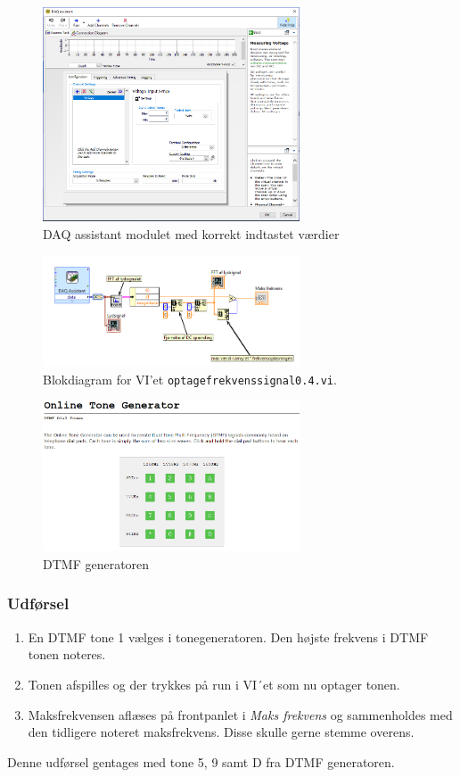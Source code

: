 \begin{figure}
			\centering
			\includegraphics[width=3in]{DAQassistant}
			\caption{DAQ assistant modulet med korrekt indtastet værdier}
			\label{fig:daq}
		\end{figure}		
		
		\begin{figure}
			\centering
			\includegraphics[width=3in]{optagefrekvenssignal04}
			\caption{Blokdiagram for VI'et \texttt{optagefrekvenssignal0.4.vi}.}
			\label{fig:vio4}
		\end{figure}
		
		\begin{figure}
			\centering
			\includegraphics[width=3in]{DTMF}
			\caption{DTMF generatoren}
			\label{fig:DTMF}
		\end{figure}
	
		\subsubsection{Udførsel}
			\begin{enumerate}
			\item En DTMF tone 1 vælges i tonegeneratoren. Den højste frekvens i DTMF tonen noteres.
			\item  Tonen afspilles og der trykkes på run i VI´et som nu optager tonen.
			\item Maksfrekvensen aflæses på frontpanlet i \textit{Maks frekvens} og sammenholdes med den tidligere noteret maksfrekvens. Disse skulle gerne stemme overens. 
			\end{enumerate}
			Denne udførsel gentages med tone 5, 9 samt D fra DTMF generatoren.
	
